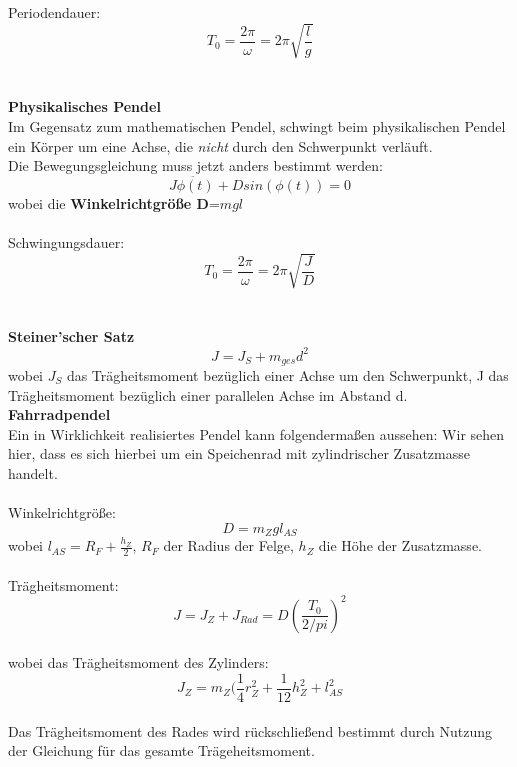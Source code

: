 \documentclass{article}
\begin{document}
Periodendauer:
\begin{equation*}
T_0 = \frac{2\pi}{\omega} = 2\pi\sqrt{\frac{l}{g}}
\end{equation*}\\
\\
\textbf{Physikalisches Pendel}\\
Im Gegensatz zum mathematischen Pendel, schwingt beim physikalischen Pendel ein Körper um eine Achse, die \textit{nicht} durch den Schwerpunkt verläuft.\\
Die Bewegungsgleichung muss jetzt anders bestimmt werden:
\begin{equation*}
J\ddot{\phi(t)} + D sin(\phi(t)) = 0
\end{equation*}
wobei die \textbf{Winkelrichtgröße D}=$mgl$\\
\\
Schwingungsdauer:
\begin{equation*}
T_0=\frac{2\pi}{\omega}=2\pi\sqrt{\frac{J}{D}}
\end{equation*}\\
\\
\textbf{Steiner'scher Satz}\\
\begin{equation*}
J = J_S + m_{ges} d^2
\end{equation*}
wobei $J_S$ das Trägheitsmoment bezüglich einer Achse um den Schwerpunkt, J das Trägheitsmoment bezüglich einer parallelen Achse im Abstand d.
\\
\textbf{Fahrradpendel}\\
Ein in Wirklichkeit realisiertes Pendel kann folgendermaßen aussehen:
Wir sehen hier, dass es sich hierbei um ein Speichenrad mit zylindrischer Zusatzmasse handelt.\\
\\
Winkelrichtgröße:
\begin{equation*}
D=m_Z g l_{AS}
\end{equation*}
wobei $l_{AS}=R_F + \frac{h_Z}{2}$, $R_F$ der Radius der Felge, $h_Z$ die Höhe der Zusatzmasse.\\
\\
Trägheitsmoment:
\begin{equation*}
J = J_Z + J_{Rad} = D (\frac{T_0}{2/pi})^2
\end{equation*}
\\
wobei das Trägheitsmoment des Zylinders:
\begin{equation*}
J_Z = m_Z(\frac{1}{4}r^2_Z + \frac{1}{12}h^2_Z+l^2_{AS}
\end{equation*}
\\
Das Trägheitsmoment des Rades wird rückschließend bestimmt durch Nutzung der Gleichung für das gesamte Trägeheitsmoment.
\end{document}
